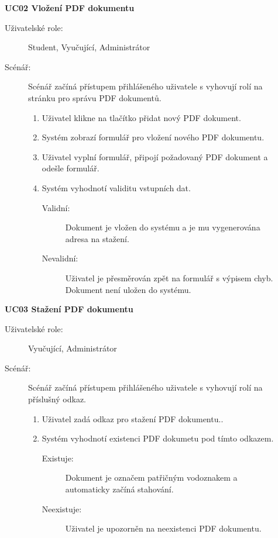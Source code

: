 \begin{description}
    \item[] \textbf{UC02 Vložení PDF dokumentu}
        \begin{description}
            \item[Uživatelské role:] Student, Vyučující, Administrátor
            \item[Scénář:] Scénář začíná přístupem přihlášeného uživatele s vyhovují rolí na stránku pro správu PDF dokumentů.  
                \begin{enumerate}
                    \item Uživatel klikne na tlačítko přidat nový PDF dokument.  
                    \item Systém zobrazí formulář pro vložení nového PDF dokumentu. 
                    \item Uživatel vyplní formulář, připojí požadovaný PDF dokument a odešle formulář. 
                    \item Systém vyhodnotí validitu vstupních dat.
                        \begin{description}
                            \item[Validní:] Dokument je vložen do systému a je mu vygenerována adresa na stažení. 
                            \item[Nevalidní:] Uživatel je přesměrován zpět na formulář s výpisem chyb. Dokument není uložen do systému. 
                        \end{description}
                \end{enumerate}
        \end{description}
\end{description}

\begin{description}
    \item[] \textbf{UC03 Stažení PDF dokumentu}
        \begin{description}
            \item[Uživatelské role:] Vyučující, Administrátor
            \item[Scénář:] Scénář začíná přístupem přihlášeného uživatele s vyhovují rolí na příslušný odkaz.  
                \begin{enumerate}
                    \item Uživatel zadá odkaz pro stažení PDF dokumentu..  
                    \item Systém vyhodnotí existenci PDF dokumetu pod tímto odkazem.
                        \begin{description}
                            \item[Existuje:] Dokument je označem patřičným vodoznakem a automaticky začíná stahování. 
                            \item[Neexistuje:] Uživatel je upozorněn na neexistenci PDF dokumentu. 
                        \end{description}
                \end{enumerate}
        \end{description}
\end{description}
